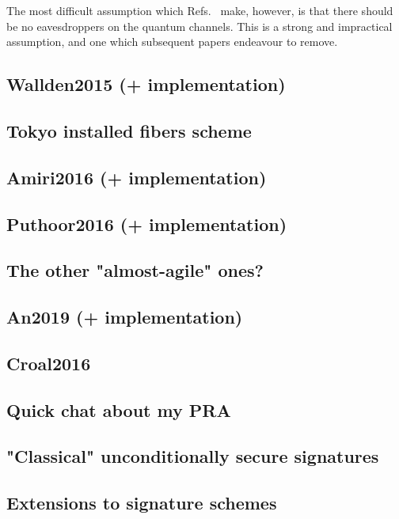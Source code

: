 The most difficult assumption which Refs.~\cite{Clarke2012, Dunjko2014, Collins2014} make, however, is that there should be no eavesdroppers on the quantum channels. This is a strong and impractical assumption, and one which subsequent papers endeavour to remove.







\subsection{Wallden2015 (+ implementation)}

\subsection{Tokyo installed fibers scheme}

\subsection{Amiri2016 (+ implementation)}

\subsection{Puthoor2016 (+ implementation)}

\subsection{The other "almost-agile" ones?}

\subsection{An2019 (+ implementation)}

\subsection{Croal2016}

\subsection{Quick chat about my PRA}

\subsection{"Classical" unconditionally secure signatures}

\subsection{Extensions to signature schemes}